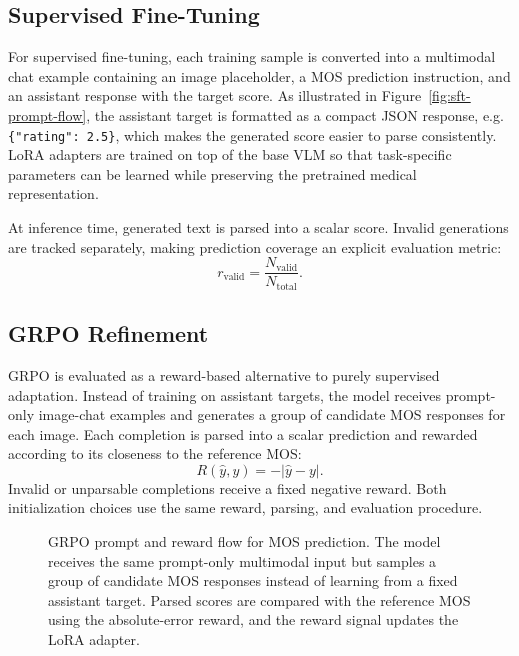 \documentclass[10pt,twocolumn,letterpaper]{article}
\begin{document}
\subsection{Supervised Fine-Tuning}
For supervised fine-tuning, each training sample is converted into a multimodal chat example containing an image placeholder, a MOS prediction instruction, and an assistant response with the target score. As illustrated in Figure~\ref{fig:sft-prompt-flow}, the assistant target is formatted as a compact JSON response, e.g. \texttt{\{"rating": 2.5\}}, which makes the generated score easier to parse consistently. LoRA adapters are trained on top of the base VLM so that task-specific parameters can be learned while preserving the pretrained medical representation.

At inference time, generated text is parsed into a scalar score. Invalid generations are tracked separately, making prediction coverage an explicit evaluation metric:
\begin{equation}
  r_{\mathrm{valid}} = \frac{N_{\mathrm{valid}}}{N_{\mathrm{total}}}.
\end{equation}

\subsection{GRPO Refinement}
GRPO is evaluated as a reward-based alternative to purely supervised adaptation. Instead of training on assistant targets, the model receives prompt-only image-chat examples and generates a group of candidate MOS responses for each image. Each completion is parsed into a scalar prediction and rewarded according to its closeness to the reference MOS:
\begin{equation}
  R(\hat{y},y)=-|\hat{y}-y|.
\end{equation}
Invalid or unparsable completions receive a fixed negative reward. Both initialization choices use the same reward, parsing, and evaluation procedure.

\begin{figure}[t]
  \centering
  \resizebox{0.98\textwidth}{!}{}
  \caption{GRPO prompt and reward flow for MOS prediction. The model receives the same prompt-only multimodal input but samples a group of candidate MOS responses instead of learning from a fixed assistant target. Parsed scores are compared with the reference MOS using the absolute-error reward, and the reward signal updates the LoRA adapter.}
  \label{fig:grpo-prompt-flow}
\end{figure}
\end{document}
